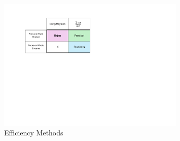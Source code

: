\documentclass[energies,article,submit,pdftex,moreauthors]{Definitions/mdpi}
\begin{document}
%
%
%
%
%
\begin{figure}[h!]
  \centering
  \includegraphics[width=0.8\textwidth]{images/efficiency_methods.pdf}
  \caption{Efficiency Methods}
  \label{fig:Efficiency Methods}
\end{figure}
\end{document}
